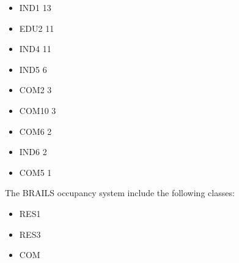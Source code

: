 \documentclass[letterpaper,10pt,english]{sphinxmanual}
\begin{document}
\begin{itemize}
\item {} 
\sphinxAtStartPar
IND1        13

\item {} 
\sphinxAtStartPar
EDU2        11

\item {} 
\sphinxAtStartPar
IND4        11

\item {} 
\sphinxAtStartPar
IND5         6

\item {} 
\sphinxAtStartPar
COM2         3

\item {} 
\sphinxAtStartPar
COM10        3

\item {} 
\sphinxAtStartPar
COM6         2

\item {} 
\sphinxAtStartPar
IND6         2

\item {} 
\sphinxAtStartPar
COM5         1

\end{itemize}

\sphinxAtStartPar
The BRAILS occupancy system include the following classes:
\begin{itemize}
\item {} 
\sphinxAtStartPar
RES1

\item {} 
\sphinxAtStartPar
RES3

\item {} 
\sphinxAtStartPar
COM

\end{itemize}
\end{document}
